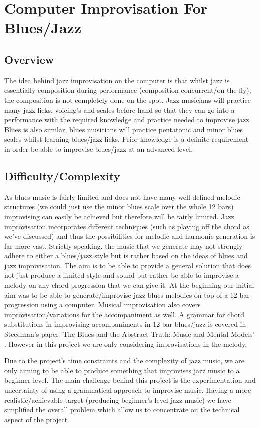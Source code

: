 \documentclass[pdftex,12pt,a4paper]{report}
\begin{document}
\section{Computer Improvisation For Blues/Jazz}

\subsection{Overview}
The idea behind jazz improvisation on the computer is that whilst jazz is essentially composition during performance (composition concurrent/on the fly), the composition is not completely done on the spot. Jazz musicians will practice many jazz licks, voicing's and scales before hand so that they can go into a performance with the required knowledge and practice needed to improvise jazz. Blues is also similar, blues musicians will practice pentatonic and minor blues scales whilst learning blues/jazz licks. Prior knowledge is a definite requirement in order be able to improvise blues/jazz at an advanced level.

\subsection{Difficulty/Complexity}
As blues music is fairly limited and does not have many well defined melodic structures (we could just use the minor blues scale over the whole 12 bars) improvising can easily be achieved but therefore will be fairly limited. Jazz improvisation incorporates different techniques (such as playing off the chord as we've discussed) and thus the possibilities for melodic and harmonic generation is far more vast. Strictly speaking, the music that we generate may not strongly adhere to either a blues/jazz style but is rather based on the ideas of blues and jazz improvisation. The aim is to be able to provide a general solution that does not just produce a limited style and sound but rather be able to improvise a melody on any chord progression that we can give it. At the beginning our initial aim was to be able to generate/improvise jazz blues melodies on top of a 12 bar progression using a computer. Musical improvisation also covers improvisation/variations for the accompaniment as well. A grammar for chord substitutions in improvising accompaniments in 12 bar blues/jazz is covered in Steedman's paper 'The Blues and the Abstract Truth: Music and Mental Models' \cite{steedman96}. However in this project we are only considering improvisations in the melody.

Due to the project's time constraints and the complexity of jazz music, we are only aiming to be able to produce something that improvises jazz music to a beginner level. The main challenge behind this project is the experimentation and uncertainty of using a grammatical approach to improvise music. Having a more realistic/achievable target (producing beginner's level jazz music) we have simplified the overall problem which allow us to concentrate on the technical aspect of the project.
\end{document}
